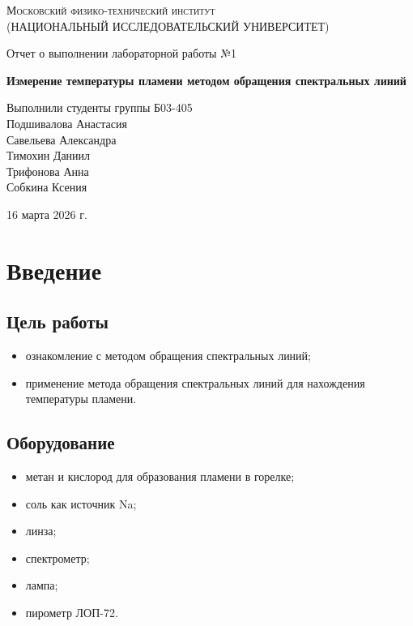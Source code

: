 \documentclass[12pt,a4paper]{article}
\def \TITLE {Отчет о выполнении лабораторной работы №1}
\def \SUBTITLE {Измерение температуры пламени методом
обращения спектральных линий}
\def \AUTHOR {Выполнили студенты группы Б03-405\\Подшивалова Анастасия\\Савельева Александра\\Тимохин Даниил\\Трифонова Анна\\Собкина Ксения}
\def \DATE {16 марта 2026 г.}
\begin{document}
\begin{titlepage}
	\centering
	\vspace{5cm}
	{\scshape\large Московский физико-технический институт \\
	(НАЦИОНАЛЬНЫЙ ИССЛЕДОВАТЕЛЬСКИЙ УНИВЕРСИТЕТ)}
	
	\vspace{4cm}
	{\LARGE \TITLE}
	
	\vspace{1cm}
	{\Huge\bf \SUBTITLE }
	
	\vspace{1cm}
	\vfill
	
\begin{flushright}
	{\LARGE \AUTHOR}
\end{flushright}
	

	\vfill

	\DATE
\end{titlepage}

\newpage

\fontsize{12}{14}\selectfont

\section{Введение}

\subsection{Цель работы}
\begin{itemize}
    \item ознакомление с методом обращения спектральных линий;
    \item применение метода обращения спектральных линий для нахождения температуры пламени.
\end{itemize}

\subsection{Оборудование}
\begin{itemize}
    \item метан и кислород для образования пламени в горелке;
    \item соль как источник Na;
    \item линза;
    \item спектрометр;
    \item лампа;
    \item пирометр ЛОП-72.
\end{itemize}
\end{document}
